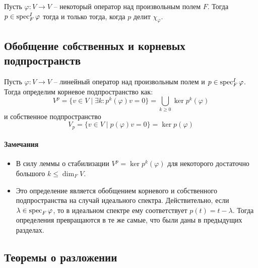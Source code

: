 \begin{claim}
[БД]
Пусть $\varphi\colon V\to V$ -- некоторый оператор над произвольным полем $F$.
Тогда $p\in \operatorname{spec}_F^I \varphi$ тогда и только тогда, когда $p$ делит $\chi_\varphi$.
\end{claim}

\subsection{Обобщение собственных и корневых подпространств}

\begin{definition}
Пусть $\varphi\colon V\to V$ -- линейный оператор над произвольным полем и $p\in \operatorname{spec}_F^I \varphi$.
Тогда определим корневое подпространство как:
\[
V^p = \{v\in V\mid \exists k\colon p^k(\varphi) v = 0\} = \bigcup_{k\geqslant 0}\ker p^k(\varphi)
\]
и собственное подпространство
\[
V_p =\{v\in V \mid p(\varphi)v = 0\} = \ker p(\varphi)
\]
\end{definition}

\paragraph{Замечания}

\begin{itemize}
\item В силу леммы о стабилизации $V^p = \ker p^k(\varphi)$ для некоторого достаточно большого $k\leqslant \dim_F V$.

\item Это определение является обобщением корневого и собственного подпространства на случай идеального спектра.
Действительно, если $\lambda\in\operatorname{spec}_F \varphi$, то в идеальном спектре ему соответствует $p(t) = t - \lambda$.
Тогда определения превращаются в те же самые, что были даны в предыдущих разделах.
\end{itemize}

\subsection{Теоремы о разложении}

